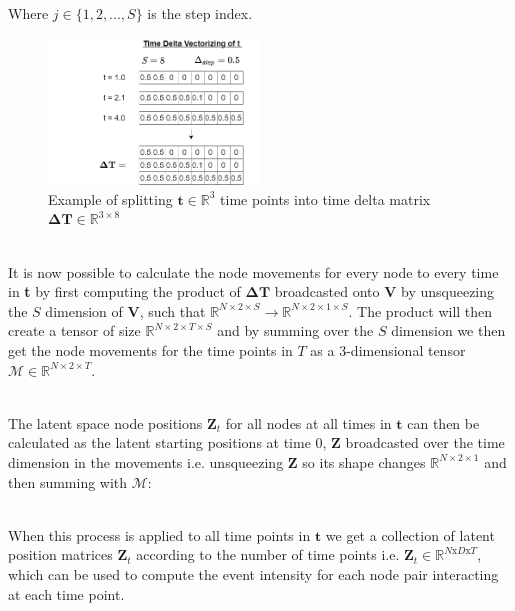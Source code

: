 Where $j \in \{1,2,...,S\}$ is the step index.
\begin{figure}[H]
    \centering
    \includegraphics[width=0.5\textwidth]{0_images/time_deltas.png}
    \caption{Example of splitting $\textbf{t} \in \mathbb{R}^3$ time points into time delta matrix $\boldsymbol{\Delta}\textbf{T} \in \mathbb{R}^{3 \times 8}$}
    \label{Method:Vectorized:fig:time_delta_split}
\end{figure}
\\
\noindent
It is now possible to calculate the node movements for every node to every time in \textbf{t} by first computing the product of $\boldsymbol{\Delta}\textbf{T}$ broadcasted\cite{BroadcastingDocumentation} onto $\textbf{V}$ by unsqueezing the $S$ dimension of $\textbf{V}$, such that $\mathbb{R}^{N \times 2 \times S} \rightarrow \mathbb{R}^{N \times 2 \times 1 \times S}$. The product will then create a tensor of size $\mathbb{R}^{N \times 2 \times T \times S}$ and by summing over the $S$ dimension we then get the node movements for the time points in $T$ as a 3-dimensional tensor $\boldsymbol{\mathcal{M}} \in \mathbb{R}^{N \times 2 \times T}$.

\\
The latent space node positions $\textbf{Z}_{t}$ for all nodes at all times in $\textbf{t}$ can then be calculated as the latent starting positions at time 0, $\textbf{Z}$ broadcasted over the time dimension in the movements i.e. unsqueezing $\textbf{Z}$ so its shape changes $\mathbb{R}^{N \times 2 \times 1}$ and then summing with $\boldsymbol{\mathcal{M}}$:

\\
When this process is applied to all time points in $\textbf{t}$ we get a collection of latent position matrices $\textbf{Z}_t$ according to the number of time points i.e. $\textbf{Z}_t \in \mathbb{R}^{N\text{x}D\text{x}T}$, which can be used to compute the event intensity for each node pair interacting at each time point.

